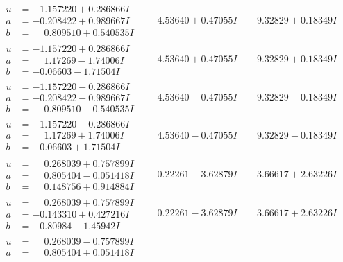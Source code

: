 \documentclass[1p]{elsarticle_modified}
\theoremstyle{definition}
\begin{document}
$$\begin{array}{c|c|c}
\begin{aligned}
u &= -1.157220 + 0.286866 I \\
a &= -0.208422 + 0.989667 I \\
b &= \phantom{-}0.809510 + 0.540535 I\end{aligned}
 & \phantom{-}4.53640 + 0.47055 I & \phantom{-}9.32829 + 0.18349 I \\ \hline\begin{aligned}
u &= -1.157220 + 0.286866 I \\
a &= \phantom{-}1.17269 - 1.74006 I \\
b &= -0.06603 - 1.71504 I\end{aligned}
 & \phantom{-}4.53640 + 0.47055 I & \phantom{-}9.32829 + 0.18349 I \\ \hline\begin{aligned}
u &= -1.157220 - 0.286866 I \\
a &= -0.208422 - 0.989667 I \\
b &= \phantom{-}0.809510 - 0.540535 I\end{aligned}
 & \phantom{-}4.53640 - 0.47055 I & \phantom{-}9.32829 - 0.18349 I \\ \hline\begin{aligned}
u &= -1.157220 - 0.286866 I \\
a &= \phantom{-}1.17269 + 1.74006 I \\
b &= -0.06603 + 1.71504 I\end{aligned}
 & \phantom{-}4.53640 - 0.47055 I & \phantom{-}9.32829 - 0.18349 I \\ \hline\begin{aligned}
u &= \phantom{-}0.268039 + 0.757899 I \\
a &= \phantom{-}0.805404 - 0.051418 I \\
b &= \phantom{-}0.148756 + 0.914884 I\end{aligned}
 & \phantom{-}0.22261 - 3.62879 I & \phantom{-}3.66617 + 2.63226 I \\ \hline\begin{aligned}
u &= \phantom{-}0.268039 + 0.757899 I \\
a &= -0.143310 + 0.427216 I \\
b &= -0.80984 - 1.45942 I\end{aligned}
 & \phantom{-}0.22261 - 3.62879 I & \phantom{-}3.66617 + 2.63226 I \\ \hline\begin{aligned}
u &= \phantom{-}0.268039 - 0.757899 I \\
a &= \phantom{-}0.805404 + 0.051418 I \\

\end{aligned}
\end{array}$$
\end{document}
